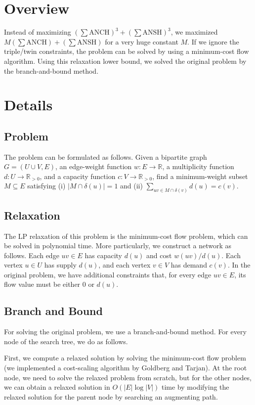 \documentclass{article}
\newcommand{\R}{\mathbb{R}}
\begin{document}
\section{Overview}

Instead of maximizing $(\sum \mathrm{ANCH})^3+(\sum \mathrm{ANSH})^3$, we maximized $M(\sum \mathrm{ANCH})+(\sum \mathrm{ANSH})$ for a very huge constant $M$.
If we ignore the triple/twin constraints, the problem can be solved by using a minimum-cost flow algorithm.
Using this relaxation lower bound, we solved the original problem by the branch-and-bound method.

\section{Details}

\subsection{Problem}

The problem can be formulated as follows.
Given a bipartite graph $G=(U\cup V,E)$, an edge-weight function $w:E\to\R$, a multiplicity function $d:U\to\R_{> 0}$, and a capacity function $c:V\to\R_{> 0}$,
find a minimum-weight subset $M\subseteq E$ satisfying (i) $|M\cap \delta(u)|=1$ and (ii) $\sum_{uv\in M\cap\delta(v)}d(u)=c(v)$.

\subsection{Relaxation}

The LP relaxation of this problem is the minimum-cost flow problem, which can be solved in polynomial time.
More particularly, we construct a network as follows.
Each edge $uv\in E$ has capacity $d(u)$ and cost $w(uv)/d(u)$.
Each vertex $u\in U$ has supply $d(u)$, and each vertex $v\in V$ has demand $c(v)$.
In the original problem, we have additional constraints that, for every edge $uv\in E$, its flow value must be either $0$ or $d(u)$.

\subsection{Branch and Bound}

For solving the original problem, we use a branch-and-bound method.
For every node of the search tree, we do as follows.

First, we compute a relaxed solution by solving the minimum-cost flow problem (we implemented a cost-scaling algorithm by Goldberg and Tarjan).
At the root node, we need to solve the relaxed problem from scratch, but for the other nodes, we can obtain a relaxed solution in $O(|E|\log |V|)$ time by modifying the relaxed solution for the parent node by searching an augmenting path.
\end{document}

